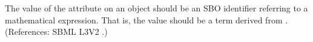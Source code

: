 The value of the attribute  on an \InitialAssignment object
should be an SBO identifier referring to a mathematical expression.  That
is, the value should be a term derived from \sbomathformula.  (References:
SBML L3V2 .)
